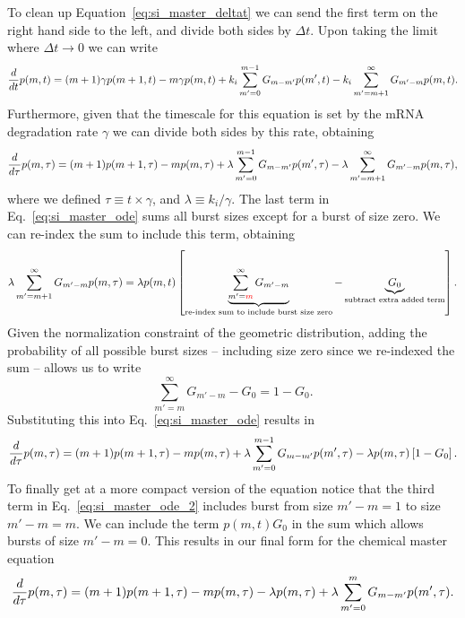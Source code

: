 To clean up Equation~\ref{eq:si_master_deltat} we can send the first term on the
right hand side to the left, and divide both sides by $\Delta t$. Upon taking
the limit where $\Delta t \rightarrow 0$ we can write
\begin{equation}
{d \over dt}p(m, t) = (m + 1) \gamma p(m + 1, t)
- m \gamma p(m, t)
+ k_i \sum_{m'=0}^{m-1} G_{m-m'} p(m', t) 
- k_i \sum_{m'=m + 1}^{\infty} G_{m'-m} p(m, t).
\end{equation}
Furthermore, given that the timescale for this equation is set by the mRNA
degradation rate $\gamma$ we can divide both sides by this rate, obtaining
\begin{equation}
{d \over d\tau}p(m, \tau) = (m + 1) p(m + 1, \tau)
- m p(m, \tau)
+ \lambda \sum_{m'=0}^{m-1} G_{m-m'} p(m', \tau) 
- \lambda \sum_{m'=m + 1}^{\infty} G_{m'-m} p(m, \tau),
\label{eq:si_master_ode}
\end{equation}
where we defined $\tau \equiv t \times \gamma$, and $\lambda \equiv k_i/\gamma$.
The last term in Eq.~\ref{eq:si_master_ode} sums all burst sizes except for a 
burst of size zero. We can re-index the sum to include this term, obtaining
\begin{equation}
\lambda \sum_{m'=m + 1}^{\infty} G_{m'-m} p(m, \tau) = \lambda p(m, t) \left[
\underbrace{\sum_{m'=\textcolor{red}{m}}^{\infty}G_{m'-m}}
_{\text{re-index sum to include burst size zero}} -
\underbrace{G_0}_{\text{subtract extra added term}}\right].
\end{equation}
Given the normalization constraint of the geometric distribution, adding the
probability of all possible burst sizes -- including size zero since we
re-indexed the sum -- allows us to write
\begin{equation}
\sum_{m'=m}^{\infty}G_{m'-m} - G_0 = 1 - G_0.
\end{equation}
Substituting this into Eq.~\ref{eq:si_master_ode} results in
\begin{equation}
{d \over d\tau}p(m, \tau) = (m + 1) p(m + 1, \tau)
- m p(m, \tau)
+ \lambda \sum_{m'=0}^{m-1} G_{m-m'} p(m', \tau) 
- \lambda p(m, \tau) \left[ 1 - G_0 \right].
\label{eq:si_master_ode_2}
\end{equation}
To finally get at a more compact version of the equation notice that the third
term in Eq.~\ref{eq:si_master_ode_2} includes burst from size $m'-m = 1$ to size
$m' - m = m$. We can include the term $p(m, t) G_0$ in the sum which allows
bursts of size $m' - m = 0$. This results in our final form for the chemical
master equation
\begin{align}
{d \over d\tau}p(m, \tau) = 
(m + 1) p(m+1, \tau)
- m p(m, \tau) - 
\lambda p(m, \tau)
+ \lambda \sum_{m^\prime=0}^m G_{m-m^\prime} p(m^\prime, \tau).
\label{eq:si_master_unreg}
\end{align}

